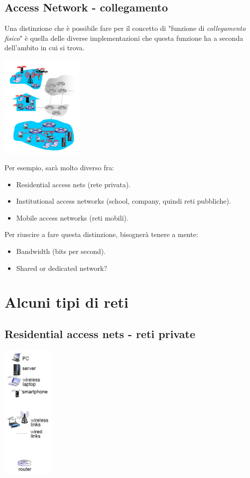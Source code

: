 \documentclass[10pt, a4paper, openany]{book}
\begin{document}
\subsection{Access Network - collegamento}
\noindent Una distinzione che è possibile fare per il concetto di "funzione di \textit{collegamento fisico}" è quella delle diverse implementazioni che questa funzione ha a seconda dell'ambito in cui si trova.
\begin{center}
    \includegraphics[width=40mm,scale=0.5]{cap1 - Introduzione alle reti - 2.jpg}
\end{center}
\noindent Per esempio, sarà molto diverso fra:
\begin{itemize}
    \item Residential access nets (rete privata).
    \item Institutional access networks (school, company, quindi reti pubbliche).
    \item Mobile access networks (reti mobili).
\end{itemize}
\noindent Per riuscire a fare questa distinzione, bisognerà tenere a mente:
\begin{itemize}
    \item Bandwidth (bits per second).
    \item Shared or dedicated network?
\end{itemize}

\section{Alcuni tipi di reti}
\subsection{Residential access nets - reti private}
\includegraphics[width=25mm]{cap1 - Introduzione alle reti - 3.jpg}
\end{document}
